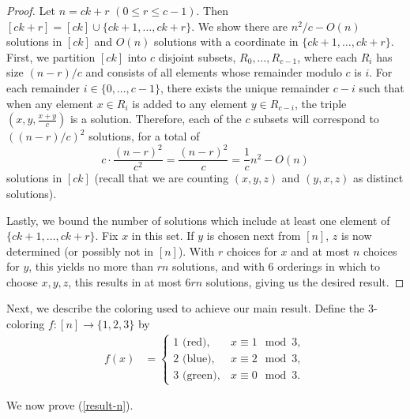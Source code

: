\begin{proof}
Let $n = ck + r$ $(0 \leq r \leq c - 1)$. Then $[ck + r] = [ck] \cup \{ck + 1,\ldots, ck + r\}$. We show there are $n^2/c - O(n)$ solutions in $[ck]$ and $O(n)$ solutions with a coordinate in $\{ck + 1,\ldots, ck + r\}$. First, we partition $[ck]$ into $c$ disjoint subsets, $R_0,\ldots,R_{c-1}$, where each $R_i$ has size $(n - r)/c$ and consists of all elements whose remainder modulo $c$ is $i$. For each remainder $i \in \{0,\ldots,c-1\}$, there exists the unique remainder $c - i$ such that when any element $x \in R_i$ is added to any element $y \in R_{c-i}$, the triple $(x, y, \frac{x + y}{c})$ is a solution. Therefore, each of the $c$ subsets will correspond to $((n - r)/c)^2$ solutions, for a total of \begin{equation}\label{eq-solns-[ck]}
    c \cdot \frac{(n-r)^2}{c^2} = \frac{(n-r)^2}{c} = \frac{1}{c}n^2 - O(n)
\end{equation} solutions in $[ck]$ (recall that we are counting $(x, y, z)$ and $(y, x, z)$ as distinct solutions). 

Lastly, we bound the number of solutions which include at least one element of $\{ck + 1,\ldots, ck + r\}$. Fix $x$ in this set. If $y$ is chosen next from $[n]$, $z$ is now determined (or possibly not in $[n]$).
With $r$ choices for $x$ and at most $n$ choices for $y$, this yields no more than $rn$ solutions, and with 6 orderings in which to choose $x,y,z$, this results in at most $6rn$ solutions, giving us the desired result.
\end{proof}

Next, we describe the coloring used to achieve our main result. 
Define the $3$-coloring $f\colon [n] \to \{1, 2, 3\}$ by \begin{align}\label{3-coloring-func}
f(x) &= 
\begin{cases}
1 \text{ (red)}, & x \equiv 1 \mod 3, \\
2 \text{ (blue)}, & x \equiv 2 \mod 3, \\
3 \text{ (green)}, & x \equiv 0 \mod 3.
\end{cases}
\end{align} 

We now prove (\ref{result-n}).

